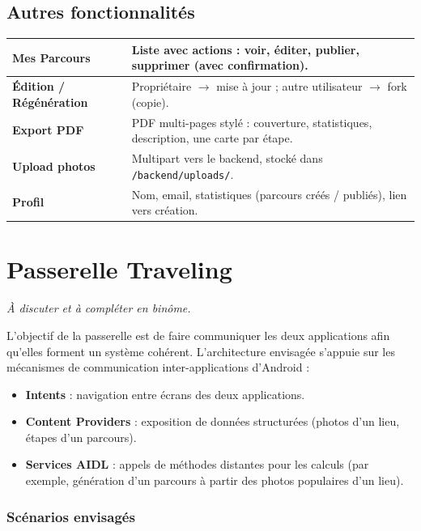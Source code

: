 \documentclass[12pt, a4paper, openany]{report}
\begin{document}
\section{Autres fonctionnalités}

\begin{tabularx}{\linewidth}{@{}>{\bfseries}lX@{}}
\toprule
Mes Parcours & Liste avec actions : voir, éditer, publier, supprimer (avec confirmation). \\
\midrule
Édition / Régénération & Propriétaire $\rightarrow$ mise à jour ; autre utilisateur
  $\rightarrow$ fork (copie). \\
\midrule
Export PDF & PDF multi-pages stylé : couverture, statistiques, description, une carte
  par étape. \\
\midrule
Upload photos & Multipart vers le backend, stocké dans \texttt{/backend/uploads/}. \\
\midrule
Profil & Nom, email, statistiques (parcours créés / publiés), lien vers création. \\
\bottomrule
\end{tabularx}

\chapter{Passerelle Traveling}

\textit{À discuter et à compléter en binôme.}

L'objectif de la passerelle est de faire communiquer les deux applications afin
qu'elles forment un système cohérent. L'architecture envisagée s'appuie sur les
mécanismes de communication inter-applications d'Android :

\begin{itemize}
  \item \textbf{Intents} : navigation entre écrans des deux applications.
  \item \textbf{Content Providers} : exposition de données structurées
    (photos d'un lieu, étapes d'un parcours).
  \item \textbf{Services AIDL} : appels de méthodes distantes pour les calculs
    (par exemple, génération d'un parcours à partir des photos populaires d'un lieu).
\end{itemize}

\subsection*{Scénarios envisagés}
\end{document}
